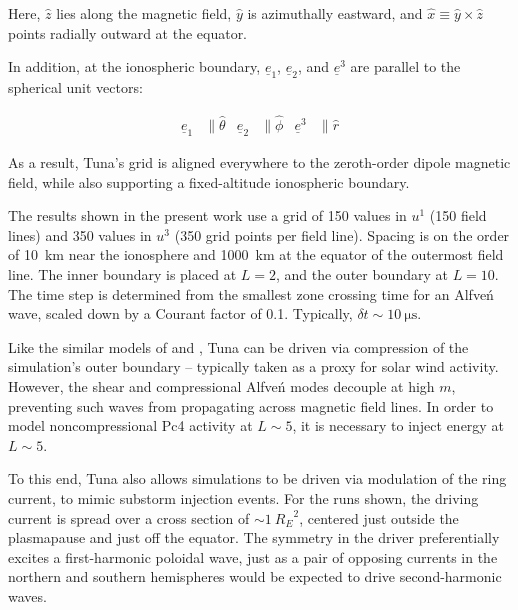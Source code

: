 \documentclass[draft,linenumbers]{agujournal}
\begin{document}
Here, $\hat{z}$ lies along the magnetic field, $\hat{y}$ is azimuthally eastward, and $\hat{x} \equiv \hat{y} \times \hat{z}$ points radially outward at the equator.

In addition, at the ionospheric boundary, $\underline{e}_1$, $\underline{e}_2$, and $\underline{e}^3$ are parallel to the spherical unit vectors:
\begin{linenomath*}
\begin{align}
  \underline{e}_1 &\parallel \hat{\theta} &
  \underline{e}_2 &\parallel \hat{\phi} &
  \underline{e}^3 &\parallel \hat{r}
\end{align}
\end{linenomath*}

As a result, Tuna's grid is aligned everywhere to the zeroth-order dipole magnetic field, while also supporting a fixed-altitude ionospheric boundary.

The results shown in the present work use a grid of 150 values in $u^1$ (150 field lines) and 350 values in $u^3$ (350 grid points per field line). Spacing is on the order of \SI{10}{\km} near the ionosphere and \SI{1000}{\km} at the equator of the outermost field line. The inner boundary is placed at $L = 2$, and the outer boundary at $L = 10$. The time step is determined from the smallest zone crossing time for an Alfve\'n wave, scaled down by a Courant factor of \num{0.1}. Typically, $\delta \! t \sim \SI{10}{\us}$.


Like the similar models of \citet{lysak_2013} and \citet{waters_2013}, Tuna can be driven via compression of the simulation's outer boundary -- typically taken as a proxy for solar wind activity. However, the shear and compressional Alfve\'n modes decouple at high $m$, preventing such waves from propagating across magnetic field lines. In order to model noncompressional Pc4 activity at $L\sim5$, it is necessary to inject energy at $L\sim5$.


To this end, Tuna also allows simulations to be driven via modulation of the ring current, to mimic substorm injection events. For the runs shown, the driving current is spread over a cross section of $\sim\SI{1}{R_E}^2$, centered just outside the plasmapause and just off the equator. The symmetry in the driver preferentially excites a first-harmonic poloidal wave, just as a pair of opposing currents in the northern and southern hemispheres would be expected to drive second-harmonic waves.
\end{document}
